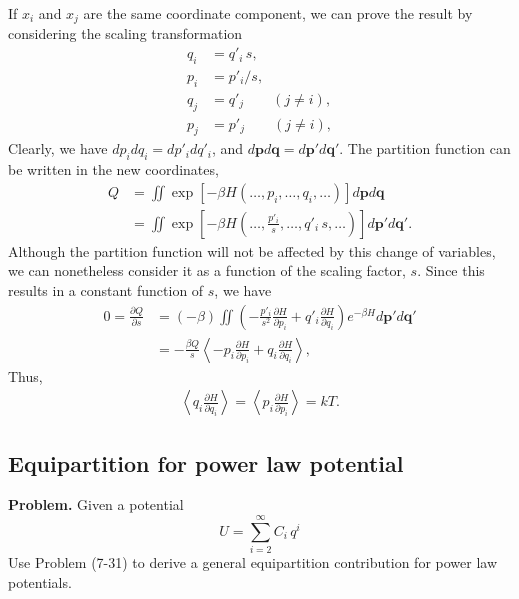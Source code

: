 \documentclass[twocolumn, 10pt]{article}
\numberwithin{equation}{section}
\newenvironment{problem}
{\par\medskip \color{problemblue}
  \textbf{Problem. }\ignorespaces}
{\medskip}
\begin{document}
If $x_i$ and $x_j$ are the same coordinate component,
we can prove the result by considering the scaling transformation
\begin{align*}
  q_i &= q'_i \, s, \\
  p_i &= p'_i / s, \\
  q_j &= q'_j \qquad (j\ne i), \\
  p_j &= p'_j \qquad (j\ne i),
\end{align*}
Clearly, we have $dp_i dq_i = dp'_i dq'_i$, and
$d\mathbf p d\mathbf q = d\mathbf p' d\mathbf q'$.
%
The partition function can be written in the new coordinates,
%
\begin{align*}
  Q
  &= \iint
  \exp\left[
    -\beta H\left(\dots, p_i, \dots, q_i, \dots\right)
    \right]
  d\mathbf p d\mathbf q
  \\
  &= \iint
  \exp\left[
    -\beta H\left(\dots, \frac{p'_i}{s}, \dots, q'_i\, s, \dots\right)
    \right]
  d\mathbf p' d\mathbf q'.
\end{align*}
%
Although the partition function will not be affected
by this change of variables,
we can nonetheless consider it as a function of
the scaling factor, $s$.
%
Since this results in a constant function of $s$, we have
\begin{align*}
  0=\frac{\partial Q}{\partial s}
  &=
  (-\beta) \iint
  \left(
  -
  \frac{p'_i}{s^2}\frac{\partial H}{\partial p_i}
  +
  q'_i\frac{\partial H}{\partial q_i}
  \right)
  e^{ -\beta H }
  d\mathbf p' d\mathbf q'
  \\
  &=
  -\frac{\beta Q}{s}
  \left\langle
  -
  p_i\frac{\partial H}{\partial p_i}
  +
  q_i\frac{\partial H}{\partial q_i}
  \right\rangle,
\end{align*}
Thus,
\begin{align*}
  \left\langle
    q_i \frac{ \partial H } { \partial q_i }
  \right\rangle
  =
  \left\langle
    p_i \frac{ \partial H } { \partial p_i }
  \right\rangle
  =
  kT
  .
\end{align*}


\subsection{Equipartition for power law potential}

\begin{problem}
  Given a potential
  $$
  U = \sum_{i=2}^\infty C_i \, q^i
  $$
  Use Problem (7-31) to derive a general
  equipartition contribution for power law potentials.
\end{problem}
\end{document}
